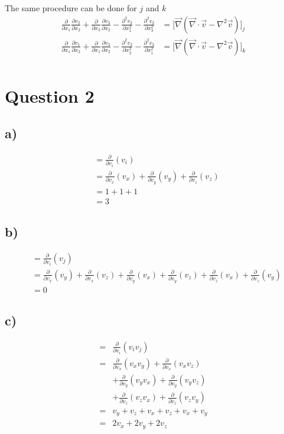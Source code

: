 \documentclass[paper=a4, fontsize=12pt]{scrartcl}
\begin{document}
The same procedure can be done for $j$ and $k$ 
\begin{align*}
\frac{\partial}{\partial x_1}\frac{\partial v_2}{\partial x_2} 
+ \frac{\partial}{\partial x_3}\frac{\partial v_3}{\partial x_2} 
- \frac{\partial ^2 v_2}{\partial x_1^2} 
-\frac{\partial^2 v_2}{\partial x_3^2} 
&= \big[\vec{\nabla}(\vec{\nabla} \cdot \vec{v} - \nabla^2 \vec{v})\big]_j\\
\frac{\partial}{\partial x_1}\frac{\partial v_1}{\partial x_3} 
+ \frac{\partial}{\partial x_1}\frac{\partial v_3}{\partial x_2} 
- \frac{\partial ^2 v_3}{\partial x_2^2} 
-\frac{\partial^2 v_3}{\partial x_1^2} 
&= \big[\vec{\nabla}(\vec{\nabla} \cdot \vec{v} - \nabla^2 \vec{v})\big]_k\\
\end{align*}


\section*{Question 2}
\subsection*{a)}
\begin{align*}
&=\frac{\partial}{\partial v_i}(v_i)\\
&= 
	\frac{\partial}{\partial v_x}(v_x) 
	+ \frac{\partial}{\partial v_y}(v_y)    
	+ \frac{\partial}{\partial v_z}(v_z)\\
& = 
	1 
	+ 1
	+ 1\\
& = 3	
\end{align*}	
\subsection*{b)}
\begin{align*}
&=\frac{\partial}{\partial v_i}(v_j)\\
&= 
\frac{\partial}{\partial v_x}(v_y) 
+ \frac{\partial}{\partial v_x}(v_z)    
+ \frac{\partial}{\partial v_y}(v_x)
+ \frac{\partial}{\partial v_y}(v_z)
+ \frac{\partial}{\partial v_z}(v_x)
+ \frac{\partial}{\partial v_z}(v_y)
\\
&= 0
\end{align*}

\subsection*{c)}
\begin{align*}
=&\frac{\partial}{\partial v_i}(v_i v_j)\\
= &
\frac{\partial}{\partial v_x}(v_x v_y) + \frac{\partial}{\partial v_x}(v_x v_z)\\
&+ \frac{\partial}{\partial v_y}(v_y v_x) + \frac{\partial}{\partial v_y}(v_y v_z)  \\   
&+ \frac{\partial}{\partial v_z}(v_z v_x) + \frac{\partial}{\partial v_z}(v_z v_y)\\
= & v_y + v_z + v_x + v_z + v_x + v_y\\
= & 2v_x + 2v_y + 2v_z
\end{align*}
\end{document}
